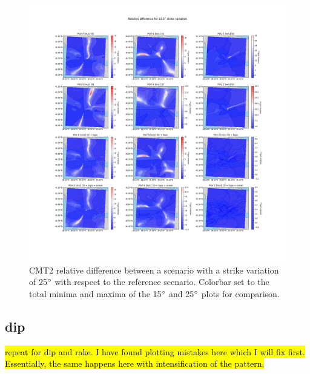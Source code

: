 \documentclass[../Text/00main.tex]{subfiles}
\begin{document}
\begin{figure}[!htp]
    \centering
    \includegraphics[width=1.2\linewidth]{images_results/strike_variation_epsilon25_sc2.png}
    \caption{CMT2 relative difference between a scenario with a strike variation of 25$\degree$ with respect to the reference scenario. Colorbar set to the total minima and maxima of the 15$\degree$ and 25$\degree$ plots for comparison.}
    \label{fig:ref_eps25-2}
\end{figure}

\FloatBarrier

\subsection{dip}

\hl{repeat for dip and rake. I have found plotting mistakes here which I will fix first. Essentially, the same happens here with intensification of the pattern.}



\end{document}
